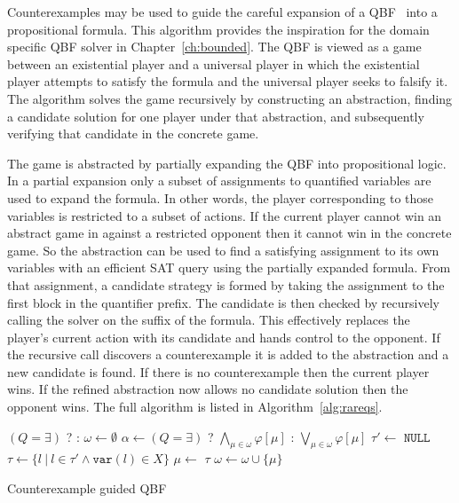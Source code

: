 Counterexamples may be used to guide the careful expansion of a QBF~\cite{Janota15} into a propositional formula. This algorithm provides the inspiration for the domain specific QBF solver in Chapter~\ref{ch:bounded}. The QBF is viewed as a game between an existential player and a universal player in which the existential player attempts to satisfy the formula and the universal player seeks to falsify it. The algorithm solves the game recursively by constructing an abstraction, finding a candidate solution for one player under that abstraction, and subsequently verifying that candidate in the concrete game.

The game is abstracted by partially expanding the QBF into propositional logic.  In a partial expansion only a subset of assignments to quantified variables are used to expand the formula. In other words, the player corresponding to those variables is restricted to a subset of actions.  If the current player cannot win an abstract game in against a restricted opponent then it cannot win in the concrete game. So the abstraction can be used to find a satisfying assignment to its own variables with an efficient SAT query using the partially expanded formula. From that assignment, a candidate strategy is formed by taking the assignment to the first block in the quantifier prefix. The candidate is then checked by recursively calling the solver on the suffix of the formula. This effectively replaces the player's current action with its candidate and hands control to the opponent. If the recursive call discovers a counterexample it is added to the abstraction and a new candidate is found. If there is no counterexample then the current player wins. If the refined abstraction now allows no candidate solution then the opponent wins. The full algorithm is listed in Algorithm~\ref{alg:rareqs}.

\begin{algorithm}
    \begin{algorithmic}[1]
            \State \Return $(Q = \exists)$ ?  : 
        \EndIf
        \State $\omega \gets \emptyset$
        \Loop
        \State $\alpha \gets (Q = \exists)$ ? $\bigwedge_{\mu \in \omega} \varphi[\mu]$ : $\bigvee_{\mu \in \omega} \varphi[\mu]$
        \State $\tau' \gets$ 
         \Return $\texttt{NULL}$ \EndIIf
        \State $\tau \gets \{ l\ |\ l \in \tau' \land \texttt{var}(l) \in X \}$
        \State $\mu \gets $ 
         \Return $\tau$ \EndIIf
        \State $\omega \gets \omega \cup \{ \mu \}$
        \EndLoop
        \EndFunction
    \end{algorithmic}
    \caption{Counterexample guided QBF}
    \label{alg:rareqs}
\end{algorithm}

